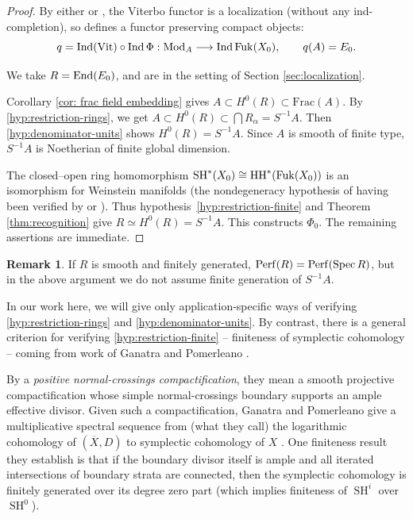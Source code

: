 \documentclass[12pt, letter]{amsart}
\theoremstyle{definition}
\newtheorem{remark}[theorem]{Remark}
\newcommand{\HH}{\operatorname{HH}}
\newcommand{\SH}{\operatorname{SH}}
\DeclareMathOperator{\Ind}{Ind}
\numberwithin{equation}{section}
\begin{document}
\begin{proof} 
By either \cite{GPS} or \cite{Sylvan}, the Viterbo functor is a localization (without any ind-completion), so defines a functor preserving compact objects: 
\[
 q=\Ind(\mathrm{Vit})\circ\Ind\Phi:
 \Mod_A\longrightarrow\Ind\Fuk(X_0),\qquad q(A)=E_0.
\]

We take $R = \operatorname{End}(E_0)$, and are in the setting of Section \ref{sec:localization}.

 Corollary \ref{cor: frac field embedding} gives $A \subset H^0(R) \subset \mathrm{Frac}(A)$.  By \ref{hyp:restriction-rings}, we get $A \subset H^0(R) \subset \bigcap R_\alpha = S^{-1} A$.  Then \ref{hyp:denominator-units} shows $H^0(R) = S^{-1} A$.
Since $A$ is smooth of finite type, $S^{-1} A$ is Noetherian of finite
global dimension.  




The closed--open ring homomorphism
$\SH^*(X_0)\cong\HH^*(\Fuk(X_0))$ \cite{Ganatra} is an isomorphism for Weinstein manifolds (the nondegeneracy hypothesis of
\cite[Theorem~1.1]{Ganatra} having been verified by \cite{CDRGG} or \cite{GPS}). 
Thus hypothesis~\ref{hyp:restriction-finite} and
Theorem \ref{thm:recognition} give $R \simeq H^0(R) = S^{-1} A$.  This constructs $\Phi_0$. The remaining assertions are immediate.
\end{proof}

\begin{remark}
    If $R$ is smooth and finitely generated,
$\mathrm{Perf}(R)=\mathrm{Perf}(\operatorname{Spec} R)$, but in the above argument we do not assume finite generation of $S^{-1}A$. 
\end{remark}




In our work here, we will give only application-specific ways of verifying \ref{hyp:restriction-rings} and \ref{hyp:denominator-units}.  By contrast, there is a general criterion for verifying \ref{hyp:restriction-finite} -- finiteness of symplectic cohomology -- coming from work of Ganatra and Pomerleano \cite{GP, Pom}. 

By a {\em  positive normal-crossings compactification}, they mean a smooth projective
compactification whose simple normal-crossings boundary supports
an ample effective divisor.  Given such a compactification, Ganatra and Pomerleano give a multiplicative spectral sequence from (what they call) the logarithmic cohomology of $(\overline X,D)$ to symplectic cohomology of $X$
\cite[Theorem 1.1]{GP}.  One finiteness result they establish is that if the boundary divisor itself is ample and all iterated intersections of boundary strata are connected, then the symplectic cohomology is finitely generated over its degree zero part \cite[Theorem 1.3]{GP}  (which implies finiteness of $\SH^i$ over $\SH^0$). 
\end{document}
